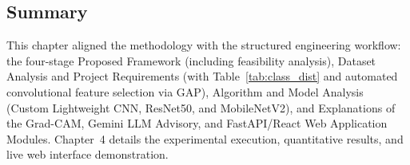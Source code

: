 \subsection*{Summary}
This chapter aligned the methodology with the structured engineering workflow: the four-stage Proposed Framework (including feasibility analysis), Dataset Analysis and Project Requirements (with Table~\ref{tab:class_dist} and automated convolutional feature selection via GAP), Algorithm and Model Analysis (Custom Lightweight CNN, ResNet50, and MobileNetV2), and Explanations of the Grad-CAM, Gemini LLM Advisory, and FastAPI/React Web Application Modules. Chapter~4 details the experimental execution, quantitative results, and live web interface demonstration.

\clearpage
